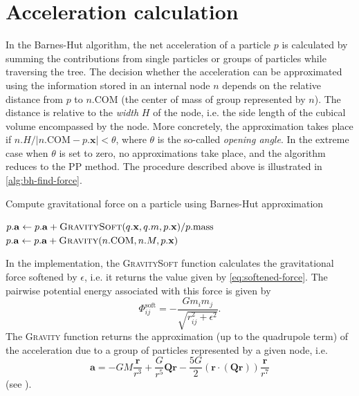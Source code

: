 \section{Acceleration calculation}
In the Barnes-Hut algorithm, the net acceleration of a particle $p$ is calculated by summing the contributions from single particles or groups of particles while traversing the tree.
The decision whether the acceleration can be approximated using the information stored in an internal node $n$ depends on the relative distance from $p$ to $n.\textrm{COM}$ (the center of mass of group represented by $n$).
The distance is relative to the \textit{width} $H$ of the node, i.e. the side length of the cubical volume encompassed by the node.
More concretely, the approximation takes place if $n.H / |n.\mathrm{COM} - p.\mathbf{x}| < \theta$, where $\theta$ is the so-called \textit{opening angle}.
In the extreme case when $\theta$ is set to zero, no approximations take place, and the algorithm reduces to the PP method.
The procedure described above is illustrated in \autoref{alg:bh-find-force}.
\begin{algorithm}
    \caption{Compute gravitational force on a particle using Barnes-Hut approximation}
    \label{alg:bh-find-force}
    \begin{algorithmic}[1]
        \State $p.\mathbf{a} \gets p.\mathbf{a} + \Call{GravitySoft}{q.\mathbf{x}, q.m, p.\mathbf{x}} / p.\text{mass}$
        \EndIf
        \State \Return
        \EndIf
        \State $p.\mathbf{a} \gets p.\mathbf{a} + \Call{Gravity}{n.\mathrm{COM}, n.M, p.\mathbf{x}}$
        \State \Return
        \EndIf
        \State {}
        \EndFor
        \EndFunction
    \end{algorithmic}
\end{algorithm}
In the implementation, the \textsc{GravitySoft} function calculates the gravitational force softened by $\epsilon$, i.e. it returns the value given by \autoref{eq:softened-force}.
The pairwise potential energy associated with this force is given by
\begin{equation}\label{eq:pe-soft}
    \Phi_{ij}^\textrm{soft} = - \frac{G m_i m_j}{\sqrt{r_{ij}^2 + \epsilon^2}}.
\end{equation}
The \textsc{Gravity} function returns the approximation (up to the quadrupole term) of the acceleration due to a group of particles represented by a given node, i.e.
\begin{equation*}
    \mathbf{a} = -GM \frac{\mathbf{r}}{r^3} + \frac{G}{r^5}\mathbf{Q}\mathbf{r} - \frac{5G}{2}(\mathbf{r} \cdot (\mathbf{Q} \mathbf{r})) \frac{\mathbf{r}}{r^7}
\end{equation*}
(see \cite{hernquist1987performance}).

